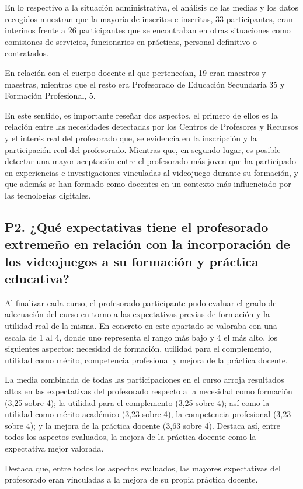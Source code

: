 \documentclass[spanish]{textolivre}
\begin{document}
En lo respectivo a la situación administrativa, el análisis de las medias y los datos recogidos muestran que la mayoría de inscritos e inscritas, 33 participantes, eran interinos frente a 26 participantes que se encontraban en otras situaciones como comisiones de servicios, funcionarios en prácticas, personal definitivo o contratados.

En relación con el cuerpo docente al que pertenecían, 19 eran maestros y maestras, mientras que el resto era Profesorado de Educación Secundaria 35 y Formación Profesional, 5.

En este sentido, es importante reseñar dos aspectos, el primero de ellos es la relación entre las necesidades detectadas por los Centros de Profesores y Recursos y el interés real del profesorado que, se evidencia en la inscripción y la participación real del profesorado. Mientras que, en segundo lugar, es posible detectar una mayor aceptación entre el profesorado más joven que ha participado en experiencias e investigaciones vinculadas al videojuego durante su formación, y que además se han formado como docentes en un contexto más influenciado por las tecnologías digitales.

\subsection{P2. ¿Qué expectativas tiene el profesorado extremeño en relación con la incorporación de los videojuegos a su formación y práctica educativa?}\label{sec-resumo}
Al finalizar cada curso, el profesorado participante pudo evaluar el grado de adecuación del curso en torno a las expectativas previas de formación y la utilidad real de la misma. En concreto en este apartado se valoraba con una escala de 1 al 4, donde uno representa el rango más bajo y 4 el más alto, los siguientes aspectos: necesidad de formación, utilidad para el complemento, utilidad como mérito, competencia profesional y mejora de la práctica docente.

La media combinada de todas las participaciones en el curso arroja resultados altos en las expectativas del profesorado respecto a la necesidad como formación (3,25 sobre 4); la utilidad para el complemento (3,25 sobre 4); así como la utilidad como mérito académico (3,23 sobre 4), la competencia profesional (3,23 sobre 4); y la mejora de la práctica docente (3,63 sobre 4). Destaca así, entre todos los aspectos evaluados, la mejora de la práctica docente como la expectativa mejor valorada.

Destaca que, entre todos los aspectos evaluados, las mayores expectativas del profesorado eran vinculadas a la mejora de su propia práctica docente.
\end{document}
